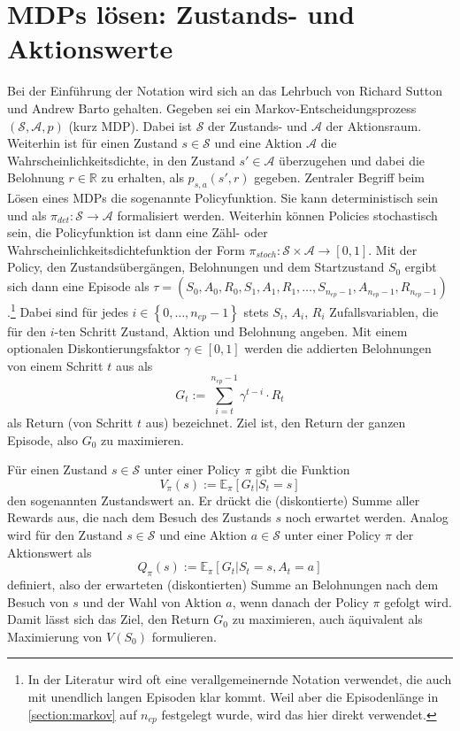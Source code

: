 \section{MDPs lösen: Zustands- und Aktionswerte}
\label{section:mdp_fundamentals}
Bei der Einführung der Notation wird sich an das Lehrbuch von Richard Sutton und Andrew Barto gehalten. \cite{Sutton1998}
Gegeben sei ein Markov-Entscheidungsprozess $(\mathcal{S}, \mathcal{A}, p)$ (kurz MDP).
Dabei ist $\mathcal{S}$ der Zustands- und $\mathcal{A}$ der Aktionsraum.
Weiterhin ist für einen Zustand $s\in \mathcal{S}$ und eine Aktion $\mathcal{A}$ die Wahrscheinlichkeitsdichte, in den Zustand $s' \in \mathcal{A}$ überzugehen und dabei die Belohnung $r \in \mathbb{R}$ zu erhalten, als $p_{s,a}(s', r)$ gegeben.
Zentraler Begriff beim Lösen eines MDPs die sogenannte Policyfunktion.
Sie kann deterministisch sein und als $\pi_{det}: \mathcal{S} \rightarrow \mathcal{A}$ formalisiert werden.
Weiterhin können Policies stochastisch sein, die Policyfunktion ist dann eine Zähl- oder Wahrscheinlichkeitsdichtefunktion der Form $\pi_{stoch}: \mathcal{S}\times\mathcal{A}\rightarrow [0, 1]$.
Mit der Policy, den Zustandsübergängen, Belohnungen und dem Startzustand $S_0$ ergibt sich dann eine Episode als $\tau = (S_0, A_0, R_0, S_1, A_1, R_1, \dots, S_{n_{ep} - 1}, A_{n_{ep} - 1}, R_{n_{ep} - 1})$.\footnote{
    In der Literatur wird oft eine verallgemeinernde Notation verwendet, die auch mit unendlich langen Episoden klar kommt.
    Weil aber die Episodenlänge in \ref{section:markov} auf $n_{ep}$ festgelegt wurde, wird das hier direkt verwendet.
}
Dabei sind für jedes $i \in \left\lbrace0, \dots, n_{ep} - 1\right\rbrace$ stets $S_i$, $A_i$, $R_i$ Zufallsvariablen, die für den $i$-ten Schritt Zustand, Aktion und Belohnung angeben.
Mit einem optionalen Diskontierungsfaktor $\gamma \in [0, 1]$ werden die addierten Belohnungen von einem Schritt $t$ aus als 
\begin{equation}
    G_t := \sum_{i=t}^{n_{ep} - 1} \gamma^{t - i} \cdot R_t
\end{equation}
als Return (von Schritt $t$ aus) bezeichnet.
Ziel ist, den Return der ganzen Episode, also $G_0$ zu maximieren.

Für einen Zustand $s \in \mathcal{S}$ unter einer Policy $\pi$ gibt die Funktion
\begin{equation}
    V_\pi(s) := \mathbb{E}_\pi\left[G_t | S_t = s\right]
\end{equation}
den sogenannten Zustandswert an.
Er drückt die (diskontierte) Summe aller Rewards aus, die nach dem Besuch des Zustands $s$ noch erwartet werden.
Analog wird für den Zustand $s \in \mathcal{S}$ und eine Aktion $a \in \mathcal{S}$ unter einer Policy $\pi$ der Aktionswert als
\begin{equation}
    Q_\pi(s) := \mathbb{E}_\pi\left[G_t | S_t = s, A_t = a\right]
\end{equation}
definiert, also der erwarteten (diskontierten) Summe an Belohnungen nach dem Besuch von $s$ und der Wahl von Aktion $a$, wenn danach der Policy $\pi$ gefolgt wird.
Damit lässt sich das Ziel, den Return $G_0$ zu maximieren, auch äquivalent als Maximierung von $V(S_0)$ formulieren.

